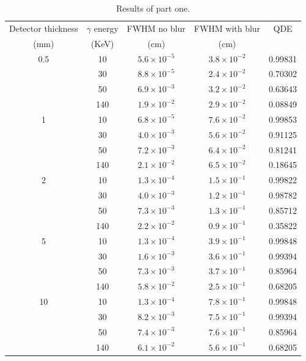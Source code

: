 \documentclass[a4paper]{article}
\begin{document}
\begin{table}
  \centering
  \begin{tabular}{|c|c|c|c|c|}
   \hline
   Detector thickness & $\gamma$ energy & FWHM no blur & FWHM with blur & QDE \\
   (mm) & (KeV) & (cm) & (cm) & \\
   \hline
   0.5 & 10 & $5.6 \times 10^{-5}$ & $3.8 \times 10^{-2}$ & 0.99831 \\
   \hline
    & 30 & $8.8 \times 10^{-5}$ & $2.4 \times 10^{-2}$ & 0.70302 \\
    \hline
    & 50 & $6.9 \times 10^{-3}$ & $3.2 \times 10^{-2}$ & 0.63643 \\
    \hline
    & 140 & $1.9 \times 10^{-2}$ & $2.9 \times 10^{-2}$ & 0.08849 \\
    \hline
   1 & 10 & $6.8 \times 10^{-5}$ & $7.6 \times 10^{-2}$ & 0.99853\\
   \hline
    & 30 & $4.0 \times 10^{-3}$ & $5.6 \times 10^{-2}$ & 0.91125\\
    \hline
    & 50 & $7.2 \times 10^{-3}$ & $6.4 \times 10^{-2}$ & 0.81241\\
    \hline
    & 140 & $2.1 \times 10^{-2}$ & $6.5 \times 10^{-2}$ & 0.18645\\
    \hline
   2 & 10 & $1.3 \times 10^{-4}$ & $1.5 \times 10^{-1}$ & 0.99822\\
   \hline
    & 30 & $4.0 \times 10^{-3}$ & $1.2 \times 10^{-1}$ & 0.98782\\
    \hline
    & 50 & $7.3 \times 10^{-3}$ & $1.3 \times 10^{-1}$ & 0.85712\\
    \hline
    & 140 & $2.2 \times 10^{-2}$ & $0.9 \times 10^{-1}$  & 0.35822\\
    \hline
   5 & 10 & $1.3 \times 10^{-4}$ & $3.9 \times 10^{-1}$ & 0.99848\\
   \hline
    & 30 & $1.6 \times 10^{-3}$ & $3.6 \times 10^{-1}$ & 0.99394\\
    \hline
    & 50 & $7.3 \times 10^{-3}$ & $3.7 \times 10^{-1}$ & 0.85964\\
    \hline
    & 140 & $5.8 \times 10^{-2}$ & $2.5 \times 10^{-1}$ & 0.68205\\
    \hline
   10 & 10 & $1.3 \times 10^{-4}$ & $7.8 \times 10^{-1}$ & 0.99848\\
   \hline
    & 30 & $8.2 \times 10^{-3}$ & $7.5 \times 10^{-1}$ & 0.99394\\
    \hline
    & 50 & $7.4 \times 10^{-3}$ & $7.6 \times 10^{-1}$ & 0.85964\\
    \hline
    & 140 & $6.1 \times 10^{-2}$ & $5.6 \times 10^{-1}$ & 0.68205\\
    \hline
  \end{tabular}
  \caption{Results of part one.}
  \label{tab:part_one}
\end{table}
\end{document}
